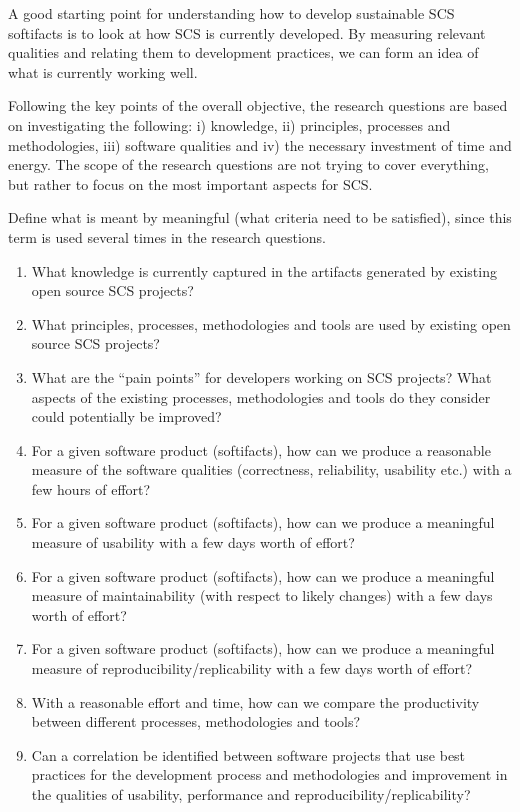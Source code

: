 \documentclass[12pt]{article}
\begin{document}
A good starting point for understanding how to develop sustainable SCS softifacts is
to look at how SCS is currently developed.  By measuring relevant qualities and
relating them to development practices, we can form an idea of what is currently
working well.

Following the key points of the overall objective, the research questions are
based on investigating the following: i) knowledge, ii) principles, processes
and methodologies, iii) software qualities and iv) the necessary investment of
time and energy.  The scope of the research questions are not trying to cover
everything, but rather to focus on the most important aspects for SCS.

Define what is meant by meaningful (what criteria need to be satisfied), since
this term is used several times in the research questions.

\begin{enumerate}
\item What knowledge is currently captured in the artifacts generated by
  existing open source SCS projects?
\item What principles, processes, methodologies and tools are used by existing
  open source SCS projects?
\item What are the ``pain points'' for developers working on SCS projects?  What
  aspects of the existing processes, methodologies and tools do they consider
  could potentially be improved?
\item For a given software product (softifacts), how can we produce a
  reasonable measure of the software qualities (correctness, reliability,
  usability etc.) with a few hours of effort?
\item For a given software product (softifacts), how can we produce a
  meaningful measure of usability with a few days worth of effort?
\item For a given software product (softifacts), how can we produce a
  meaningful measure of maintainability (with respect to likely changes) with a
  few days worth of effort?
\item For a given software product (softifacts), how can we produce a
  meaningful measure of reproducibility/replicability with a few days worth of
  effort?
\item With a reasonable effort and time, how can we compare the productivity
  between different processes, methodologies and tools?
\item Can a correlation be identified between software projects that use best 
  practices for the development process and methodologies and improvement in the
  qualities of usability, performance and reproducibility/replicability?
\end{enumerate}
\end{document}
